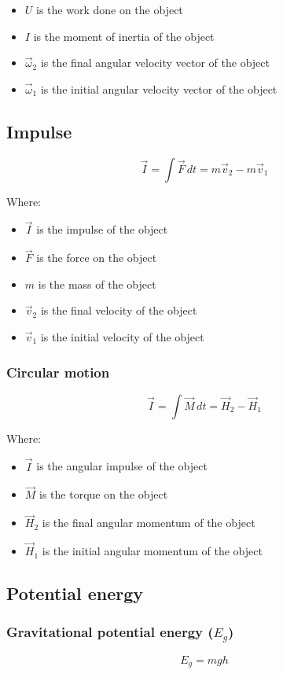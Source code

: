 \documentclass[11pt]{article}
\begin{document}
\begin{itemize}
\item \(U\) is the work done on the object
\item \(I\) is the moment of inertia of the object
\item \(\vec{\omega}_2\) is the final angular velocity vector of the object
\item \(\vec{\omega}_1\) is the initial angular velocity vector of the object
\end{itemize}

\subsection{Impulse}
\label{sec:org2dacc4f}
\[\vec{I} = \int \vec{F} \, dt = m \vec{v}_2 - m \vec{v}_1\]

Where:
\begin{itemize}
\item \(\vec{I}\) is the impulse of the object
\item \(\vec{F}\) is the force on the object
\item \(m\) is the mass of the object
\item \(\vec{v}_2\) is the final velocity of the object
\item \(\vec{v}_1\) is the initial velocity of the object
\end{itemize}

\subsubsection{Circular motion}
\label{sec:orgb4e4f3f}
\[\vec{I} = \int \vec{M} \, dt = \vec{H}_2 - \vec{H}_1\]

Where:
\begin{itemize}
\item \(\vec{I}\) is the angular impulse of the object
\item \(\vec{M}\) is the torque on the object
\item \(\vec{H}_2\) is the final angular momentum of the object
\item \(\vec{H}_1\) is the initial angular momentum of the object
\end{itemize}

\subsection{Potential energy}
\label{sec:orgefa7d31}

\subsubsection{Gravitational potential energy (\(E_g\))}
\label{sec:org30ccea5}
\[E_g = mgh\]
\end{document}
